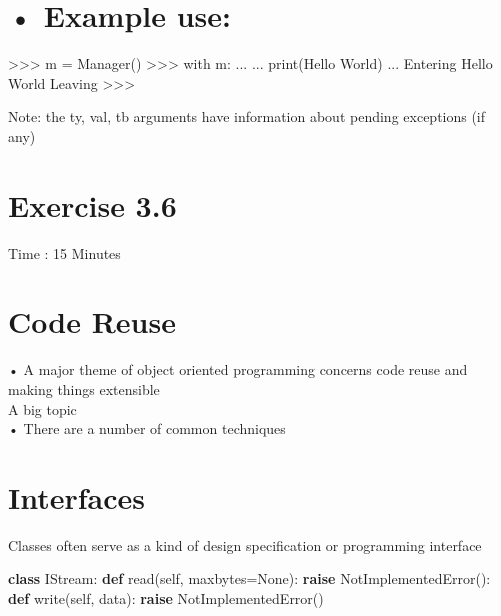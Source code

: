 \documentclass[
  letterpaper,
  DIV=11,
  numbers=noendperiod]{scrreprt}
\newenvironment{Shaded}{\begin{snugshade}}{\end{snugshade}}
\newcommand{\ControlFlowTok}[1]{\textcolor[rgb]{0.00,0.23,0.31}{\textbf{#1}}}
\newcommand{\KeywordTok}[1]{\textcolor[rgb]{0.00,0.23,0.31}{\textbf{#1}}}
\newcommand{\NormalTok}[1]{\textcolor[rgb]{0.00,0.23,0.31}{#1}}
\newcommand{\OperatorTok}[1]{\textcolor[rgb]{0.37,0.37,0.37}{#1}}
\newcommand{\PreprocessorTok}[1]{\textcolor[rgb]{0.68,0.00,0.00}{#1}}
\newcommand{\VariableTok}[1]{\textcolor[rgb]{0.07,0.07,0.07}{#1}}
\begin{document}

\chapter{• Example use:}\label{example-use-1}

\begin{Shaded}
\begin{Highlighting}[]
\NormalTok{\textgreater{}\textgreater{}\textgreater{} m = Manager()}
\NormalTok{\textgreater{}\textgreater{}\textgreater{} with m:}
\NormalTok{...}
\NormalTok{...}
\NormalTok{print(\textquotesingle{}Hello World\textquotesingle{})}
\NormalTok{...}
\NormalTok{Entering}
\NormalTok{Hello World}
\NormalTok{Leaving}
\NormalTok{\textgreater{}\textgreater{}\textgreater{} }
\end{Highlighting}
\end{Shaded}

Note: the ty, val, tb arguments have information about pending
exceptions (if any)


\chapter{Exercise 3.6}\label{exercise-3.6}

Time : 15 Minutes


\chapter{Code Reuse}\label{code-reuse}

• A major theme of object oriented programming concerns code reuse and
making things extensible\\
A big topic\\
• There are a number of common techniques


\chapter{Interfaces}\label{interfaces}

Classes often serve as a kind of design specification or programming
interface

\begin{Shaded}
\begin{Highlighting}[]
\KeywordTok{class}\NormalTok{ IStream: }\KeywordTok{def}\NormalTok{ read(}\VariableTok{self}\NormalTok{, maxbytes}\OperatorTok{=}\VariableTok{None}\NormalTok{): }\ControlFlowTok{raise} \PreprocessorTok{NotImplementedError}\NormalTok{(): }\KeywordTok{def}\NormalTok{ write(}\VariableTok{self}\NormalTok{, data): }\ControlFlowTok{raise} \PreprocessorTok{NotImplementedError}\NormalTok{() }
\end{Highlighting}
\end{Shaded}
\end{document}

